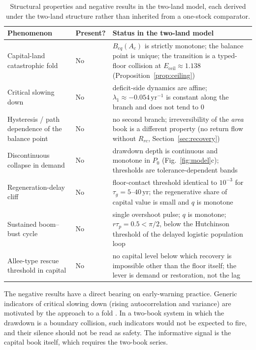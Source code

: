 \documentclass[preprint,12pt,authoryear]{elsarticle}
\newcommand{\Eceil}{E_{\mathrm{ceil}}}
\begin{document}
\begin{table}[!htbp]
\centering\small
\caption{Structural properties and negative results in the two-land model, each derived under the two-land structure rather than inherited from a one-stock comparator.}
\label{tab:neg}
\begin{tabularx}{\textwidth}{>{\raggedright\arraybackslash}p{} l X}
\toprule
Phenomenon & Present? & Status in the two-land model \\
\midrule
Capital-land catastrophic fold & No & $B_{eq}(A_c)$ is strictly monotone; the balance point is unique; the transition is a typed-floor collision at $\Eceil\approx1.138$ (Proposition~\ref{prop:ceiling}) \\
Critical slowing down & No & deficit-side dynamics are affine; $\lambda_1\approx-0.054\,\mathrm{yr}^{-1}$ is constant along the branch and does not tend to $0$ \\
Hysteresis / path dependence of the balance point & No & no second branch; irreversibility of the \emph{area} book is a different property (no return flow without $R_{rc}$, Section~\ref{sec:recovery}) \\
Discontinuous collapse in demand & No & drawdown depth is continuous and monotone in $P_0$ (Fig.~\ref{fig:model}c); thresholds are tolerance-dependent bands \\
Regeneration-delay cliff & No & floor-contact threshold identical to $10^{-3}$ for $\tau_g=5$--$40$\,yr; the regenerative share of capital value is small and $q$ is monotone \\
Sustained boom--bust cycle & No & single overshoot pulse; $q$ is monotone; $r\tau_p=0.5<\pi/2$, below the Hutchinson threshold of the delayed logistic population loop \citep{Hutchinson1948} \\
Allee-type rescue threshold in capital & No & no capital level below which recovery is impossible other than the floor itself; the lever is demand or restoration, not the lag \\
\bottomrule
\end{tabularx}
\end{table}

The negative results have a direct bearing on early-warning practice. Generic indicators of critical slowing down (rising autocorrelation and variance) are motivated by the approach to a fold \citep{Scheffer2001}. In a two-book system in which the drawdown is a boundary collision, such indicators would not be expected to fire, and their silence should not be read as safety. The informative signal is the capital book itself, which requires the two-book series.
\end{document}
